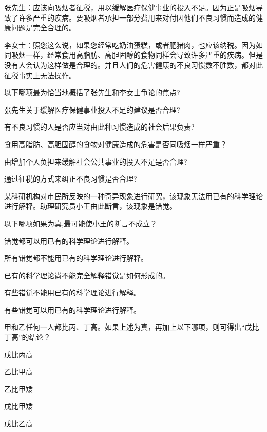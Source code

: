 \documentclass{exam-zh}
\begin{document}
\begin{question}
张先生：应该向吸烟者征税，用以缓解医疗保健事业的投入不足。因为正是吸烟导致了许多严重的疾病。要吸烟者承担一部分费用来对付因他们不良习惯而造成的健康问题是完全合理的。

李女士：照您这么说，如果您经常吃奶油蛋糕，或者肥猪肉，也应该纳税。因为如同吸烟一样，经常食用高脂肪、高胆固醇的食物同样会导致许多严重的疾病。但是没有人会认为这样做是合理的。并且人们的危害健康的不良习惯数不胜数，都对此征税事实上无法操作。

以下哪项最为恰当地概括了张先生和李女士争论的焦点? \paren[]
\begin{choices}
  \item 张先生关于缓解医疗保健事业投入不足的建议是否合理?
  \item 有不良习惯的人是否应当对由此种习惯造成的社会后果负责?
  \item 食用高脂肪、高胆固醇的食物对健康造成的危害是否同吸烟一样严重？
  \item 由增加个人负担来缓解社会公共事业的投入不足是否合理?
  \item 通过征税的方式来纠正不良习惯是否合理?
\end{choices}
\end{question}

\begin{question}
某科研机构对市民所反映的一种奇异现象进行研究，该现象无法用已有的科学理论进行解释。助理研究员小王由此断言，该现象是错觉。

以下哪项如果为真,最可能使小王的断言不成立？ \paren[]
\begin{choices}
  \item 错觉都可以用已有的科学理论进行解释。
  \item 所有错觉都不能用已有的科学理论进行解释。
  \item 已有的科学理论尚不能完全解释错觉是如何形成的。
  \item 有些错觉不能用已有的科学理论进行解释。
  \item 有些错觉可以用已有的科学理论进行解释。
\end{choices}
\end{question}

\begin{question}
甲和乙任何一人都比丙、丁高。如果上述为真，再加上以下哪项，则可得出“戊比丁高”的结论？ \paren[]
\begin{choices}
  \item 戊比丙高
  \item 乙比甲高
  \item 乙比甲矮
  \item 戊比甲矮
  \item 戊比乙高
\end{choices}
\end{question}
\end{document}
